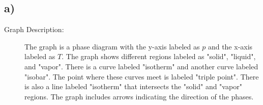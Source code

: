 

\subsection*{a)}

\begin{description}
    \item[Graph Description:] The graph is a phase diagram with the y-axis labeled as $p$ and the x-axis labeled as $T$. The graph shows different regions labeled as "solid", "liquid", and "vapor". There is a curve labeled "isotherm" and another curve labeled "isobar". The point where these curves meet is labeled "triple point". There is also a line labeled "isotherm" that intersects the "solid" and "vapor" regions. The graph includes arrows indicating the direction of the phases.
\end{description}